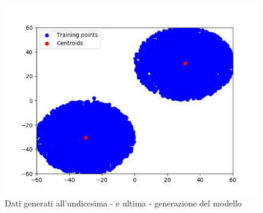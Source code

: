 \begin{figure}[!htb]
  \centering
  \includegraphics[scale=0.7]{../Immagini/train11.png}
  \caption{Dati generati all'undicesima - e ultima - generazione del modello}
  \label{fig:train11}
\end{figure}
\newpage
